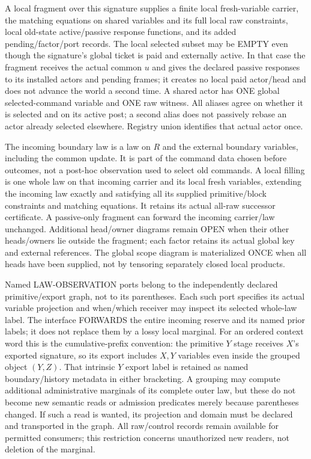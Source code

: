 \documentclass[11pt]{article}\usepackage{amsmath,amssymb,amsthm}
\begin{document}
A local fragment over this signature supplies a finite local fresh-variable carrier, the matching equations on shared variables and its full local raw constraints, local old-state active/passive response functions, and its added pending/factor/port records. The local selected subset may be EMPTY even though the signature's global ticket is paid and externally active. In that case the fragment receives the actual common $u$ and gives the declared passive responses to its installed actors and pending frames; it creates no local paid actor/head and does not advance the world a second time. A shared actor has ONE global selected-command variable and ONE raw witness. All aliases agree on whether it is selected and on its active post; a second alias does not passively rebase an actor already selected elsewhere. Registry union identifies that actual actor once.

The incoming boundary law is a law on $R$ and the external boundary variables, including the common update. It is part of the command data chosen before outcomes, not a post-hoc observation used to select old commands. A local filling is one whole law on that incoming carrier and its local fresh variables, extending the incoming law exactly and satisfying all its supplied primitive/block constraints and matching equations. It retains its actual all-raw successor certificate. A passive-only fragment can forward the incoming carrier/law unchanged. Additional head/owner diagrams remain OPEN when their other heads/owners lie outside the fragment; each factor retains its actual global key and external references. The global scope diagram is materialized ONCE when all heads have been supplied, not by tensoring separately closed local products.

Named LAW-OBSERVATION ports belong to the independently declared primitive/export graph, not to its parentheses. Each such port specifies its actual variable projection and when/which receiver may inspect its selected whole-law label. The interface FORWARDS the entire incoming reserve and its named prior labels; it does not replace them by a lossy local marginal. For an ordered context word this is the cumulative-prefix convention: the primitive $Y$ stage receives $X$'s exported signature, so its export includes $X,Y$ variables even inside the grouped object $(Y,Z)$. That intrinsic $Y$ export label is retained as named boundary/history metadata in either bracketing. A grouping may compute additional administrative marginals of its complete outer law, but these do not become new semantic reads or admission predicates merely because parentheses changed. If such a read is wanted, its projection and domain must be declared and transported in the graph. All raw/control records remain available for permitted consumers; this restriction concerns unauthorized new readers, not deletion of the marginal.
\end{document}
